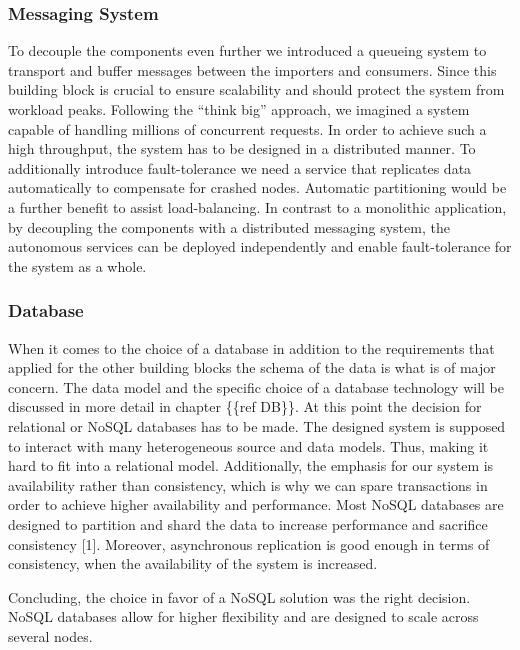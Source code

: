 \subsubsection{Messaging System}\label{messaging-system}

To decouple the components even further we introduced a queueing system
to transport and buffer messages between the importers and consumers.
Since this building block is crucial to ensure scalability and should
protect the system from workload peaks. Following the ``think big''
approach, we imagined a system capable of handling millions of
concurrent requests. In order to achieve such a high throughput, the
system has to be designed in a distributed manner. To additionally
introduce fault-tolerance we need a service that replicates data
automatically to compensate for crashed nodes. Automatic partitioning
would be a further benefit to assist load-balancing. In contrast to a
monolithic application, by decoupling the components with a distributed
messaging system, the autonomous services can be deployed independently
and enable fault-tolerance for the system as a whole.

\subsubsection{Database}\label{database}

When it comes to the choice of a database in addition to the
requirements that applied for the other building blocks the schema of
the data is what is of major concern. The data model and the specific
choice of a database technology will be discussed in more detail in
chapter \{\{ref DB\}\}. At this point the decision for relational or
NoSQL databases has to be made. The designed system is supposed to
interact with many heterogeneous source and data models. Thus, making it
hard to fit into a relational model. Additionally, the emphasis for our
system is availability rather than consistency, which is why we can
spare transactions in order to achieve higher availability and
performance. Most NoSQL databases are designed to partition and shard
the data to increase performance and sacrifice consistency {[}1{]}.
Moreover, asynchronous replication is good enough in terms of
consistency, when the availability of the system is increased.

Concluding, the choice in favor of a NoSQL solution was the right
decision. NoSQL databases allow for higher flexibility and are designed
to scale across several nodes.

